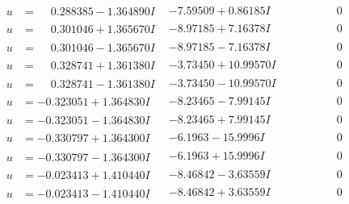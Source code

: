 \documentclass[1p]{elsarticle_modified}
\theoremstyle{definition}
\begin{document}
$$\begin{array}{c|c|c}
\begin{aligned}
u &= \phantom{-}0.288385 - 1.364890 I\end{aligned}
 & -7.59509 + 0.86185 I & \phantom{-0.000000 } 0 \\ \hline\begin{aligned}
u &= \phantom{-}0.301046 + 1.365670 I\end{aligned}
 & -8.97185 + 7.16378 I & \phantom{-0.000000 } 0 \\ \hline\begin{aligned}
u &= \phantom{-}0.301046 - 1.365670 I\end{aligned}
 & -8.97185 - 7.16378 I & \phantom{-0.000000 } 0 \\ \hline\begin{aligned}
u &= \phantom{-}0.328741 + 1.361380 I\end{aligned}
 & -3.73450 + 10.99570 I & \phantom{-0.000000 } 0 \\ \hline\begin{aligned}
u &= \phantom{-}0.328741 - 1.361380 I\end{aligned}
 & -3.73450 - 10.99570 I & \phantom{-0.000000 } 0 \\ \hline\begin{aligned}
u &= -0.323051 + 1.364830 I\end{aligned}
 & -8.23465 - 7.99145 I & \phantom{-0.000000 } 0 \\ \hline\begin{aligned}
u &= -0.323051 - 1.364830 I\end{aligned}
 & -8.23465 + 7.99145 I & \phantom{-0.000000 } 0 \\ \hline\begin{aligned}
u &= -0.330797 + 1.364300 I\end{aligned}
 & -6.1963 - 15.9996 I & \phantom{-0.000000 } 0 \\ \hline\begin{aligned}
u &= -0.330797 - 1.364300 I\end{aligned}
 & -6.1963 + 15.9996 I & \phantom{-0.000000 } 0 \\ \hline\begin{aligned}
u &= -0.023413 + 1.410440 I\end{aligned}
 & -8.46842 - 3.63559 I & \phantom{-0.000000 } 0 \\ \hline\begin{aligned}
u &= -0.023413 - 1.410440 I\end{aligned}
 & -8.46842 + 3.63559 I & \phantom{-0.000000 } 0 \\ \hline\begin{aligned}

\end{aligned}
\end{array}$$
\end{document}
